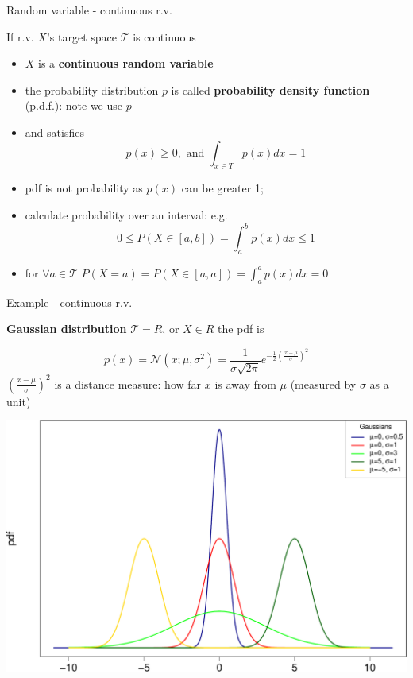 \documentclass[ignorenonframetext,]{beamer}
\providecommand{\tightlist}{%
  \setlength{\itemsep}{0pt}\setlength{\parskip}{0pt}}
\newcommand{\normal}[2]{\ensuremath{\mathcal{N}\left (#1,#2 \right )}}
\begin{document}
\begin{frame}{Random variable - continuous r.v.}
\protect\hypertarget{random-variable---continuous-r.v.}{}

If r.v. \(X\)'s target space \(\mathcal{T}\) is continuous

\begin{itemize}
\tightlist
\item
  \(X\) is a \textbf{continuous random variable }
\item
  the probability distribution \(p\) is called \textbf{probability
  density function} (p.d.f.): note we use \(p\)
\item
  and satisfies \[p(x) \geq 0, \text{ and } \int_{x\in T} p(x) dx = 1\]
\item
  pdf is not probability as \(p(x)\) can be greater 1;
\item
  calculate probability over an interval: e.g.
  \[0\leq P(X \in [a,b]) = \int_{a}^b p(x) dx \leq 1\]
\item
  for \(\forall a\in \mathcal{T}\)
  \(P(X=a) = P(X\in [a,a]) =\int_{a}^a p(x) dx=0\)
\end{itemize}

\end{frame}

\begin{frame}{Example - continuous r.v.}
\protect\hypertarget{example---continuous-r.v.}{}

\textbf{Gaussian distribution} \(\mathcal{T} = R\), or \(X \in R\) the
pdf is

\[p(x) = \normal{x; \mu}{\sigma^2}=\frac{1}{\sigma \sqrt{2\pi}} e^{-\frac{1}{2}(\frac{x-\mu}{\sigma})^2}\]
\((\frac{x-\mu}{\sigma})^2\) is a distance measure: how far \(x\) is
away from \(\mu\) (measured by \(\sigma\) as a unit)

\begin{center}\includegraphics[width=0.65\linewidth]{lecture4_files/figure-beamer/unnamed-chunk-3-1} \end{center}

\end{frame}
\end{document}
